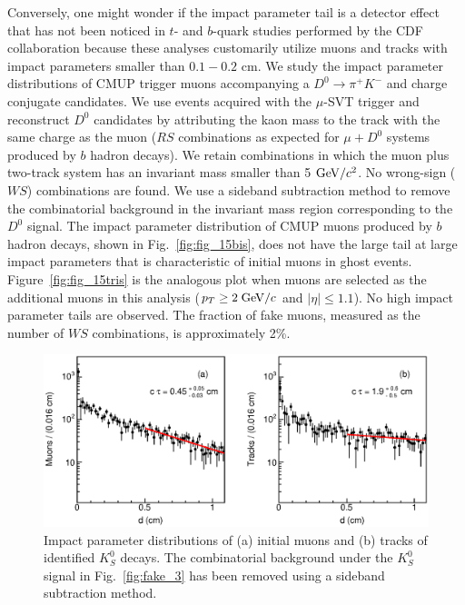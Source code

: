 \documentclass[aps,prd,preprint,floatfix,nofootinbib,superscriptaddress,showpacs,amssymb]{revtex4}
\begin{document}
 Conversely, one might wonder if the impact parameter tail is a detector
 effect that has not been noticed in  $t$- and $b$-quark studies
 performed by the CDF collaboration because these analyses customarily
 utilize muons and tracks with impact parameters smaller than $0.1-0.2$ cm.
 We study the impact parameter distributions of CMUP trigger muons
 accompanying a $D^0 \rightarrow \pi^+ K^-$ and charge conjugate
 candidates. We use events acquired with the $\mu$-SVT trigger and
 reconstruct $D^0$ candidates by attributing the kaon mass to the track
 with the same charge as the muon ($RS$ combinations as expected for
 $\mu+D^0$ systems produced by $b$ hadron decays). We retain combinations
 in which the muon plus two-track system has an invariant mass smaller
 than 5 ${\rm GeV/}c^2$. No wrong-sign ($WS$) combinations are found. We use
 a sideband subtraction method to remove the combinatorial background
 in the invariant mass region corresponding to the $D^0$ signal. The
 impact parameter distribution of CMUP muons produced by $b$ hadron
 decays, shown in Fig.~\ref{fig:fig_15bis}, does not have the large
 tail at large impact parameters that is characteristic of initial
 muons in ghost events. Figure~\ref{fig:fig_15tris} is the analogous
 plot when muons are selected as the  additional muons in this
 analysis ($p_T \geq 2 \; {\rm GeV/}c$ and $|\eta| \leq 1.1$). No high
 impact parameter tails are observed. The fraction of fake muons,
 measured as the number of $WS$ combinations, is approximately 2\%. 
 \begin{figure}
 \begin{center}
 \vspace{-0.3in}
 \leavevmode
 \includegraphics*[width=\textwidth]{K0_ip.eps}
 \caption[]{ Impact parameter distributions of (a) initial muons and (b)
             tracks of identified $K^0_S$ decays. The combinatorial
             background under the $K^0_S$ signal in  Fig.~\ref{fig:fake_3}
             has been removed using a sideband subtraction method.}
 \label{fig:fake_5}
 \end{center}
 \end{figure}
\end{document}
